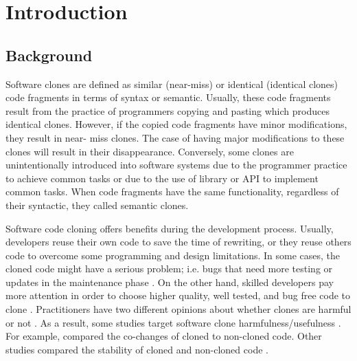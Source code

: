 \chapter{Introduction}

\section{Background}

Software clones are defined as similar (near-miss) or identical (identical clones) code fragments in terms of syntax or semantic. Usually, these code fragments result from the practice of programmers copying and pasting which produces identical clones. However, if the copied code fragments have minor modifications, they result in near- miss clones. The case of having major modifications to these clones will result in their disappearance. Conversely, some clones are unintentionally introduced into software systems due to the programmer practice to achieve common tasks or due to the use of library or API to implement common tasks. When code fragments have the same functionality, regardless of their syntactic, they called semantic clones. 

Software code cloning offers benefits during the development process. Usually, developers reuse their own code to save the time of rewriting, or they reuse others code to overcome some programming and design limitations\cite{Roy2007}. In some cases, the cloned code might have a serious problem; i.e. bugs that need more testing or updates in the maintenance phase \cite{Geiger2006,Rajapakse2005}. On the other hand, skilled developers pay more attention in order to choose higher quality, well tested, and bug free code to clone \cite{Cordy2003,Kim2005}. Practitioners have two different opinions about whether clones are harmful \cite{Bazrafshan2013, Ducasse1999, Kapser2006, Kamiya2002, Livieri2007,Mondal2012} or not \cite{Kapser2008,Cordy2003,Kapser2006,Kapser2004,Gode2011}. As a result, some studies target software clone harmfulness/usefulness \cite{Hordijk2009}. For example, \cite{Kim2005,RetoGeiger,Lozano2007} compared the co-changes of cloned to non-cloned code. Other studies compared the stability of cloned and non-cloned code \cite{Hotta2012,Harder2013,Mondal2012a,Krinke2008}. 



